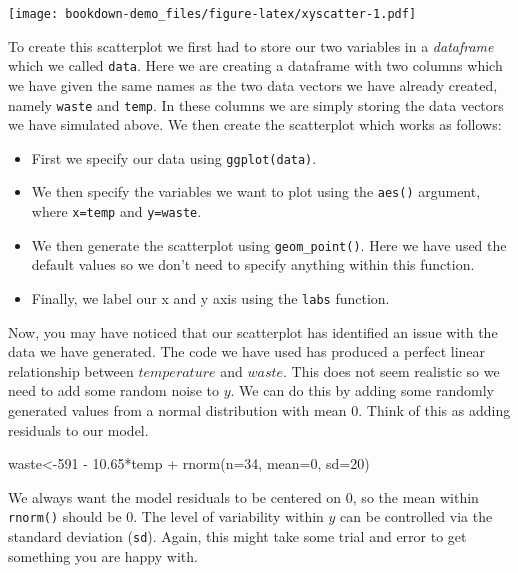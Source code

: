 \documentclass[
]{book}
\newenvironment{Shaded}{\begin{snugshade}}{\end{snugshade}}
\newcommand{\AttributeTok}[1]{\textcolor[rgb]{0.77,0.63,0.00}{#1}}
\newcommand{\DecValTok}[1]{\textcolor[rgb]{0.00,0.00,0.81}{#1}}
\newcommand{\FloatTok}[1]{\textcolor[rgb]{0.00,0.00,0.81}{#1}}
\newcommand{\FunctionTok}[1]{\textcolor[rgb]{0.00,0.00,0.00}{#1}}
\newcommand{\NormalTok}[1]{#1}
\newcommand{\OtherTok}[1]{\textcolor[rgb]{0.56,0.35,0.01}{#1}}
\newcommand{\SpecialCharTok}[1]{\textcolor[rgb]{0.00,0.00,0.00}{#1}}
\providecommand{\tightlist}{%
  \setlength{\itemsep}{0pt}\setlength{\parskip}{0pt}}
\begin{document}
\texttt{[image: bookdown-demo\_files/figure-latex/xyscatter-1.pdf]}

To create this scatterplot we first had to store our two variables in a \emph{dataframe} which we called \texttt{data}. Here we are creating a dataframe with two columns which we have given the same names as the two data vectors we have already created, namely \texttt{waste} and \texttt{temp}. In these columns we are simply storing the data vectors we have simulated above. We then create the scatterplot which works as follows:

\begin{itemize}
\tightlist
\item
  First we specify our data using \texttt{ggplot(data)}.
\item
  We then specify the variables we want to plot using the \texttt{aes()} argument, where \texttt{x=temp} and \texttt{y=waste}.
\item
  We then generate the scatterplot using \texttt{geom\_point()}. Here we have used the default values so we don't need to specify anything within this function.
\item
  Finally, we label our x and y axis using the \texttt{labs} function.
\end{itemize}

Now, you may have noticed that our scatterplot has identified an issue with the data we have generated. The code we have used has produced a perfect linear relationship between \(temperature\) and \(waste\). This does not seem realistic so we need to add some random noise to \(y\). We can do this by adding some randomly generated values from a normal distribution with mean 0. Think of this as adding residuals to our model.

\begin{Shaded}
\begin{Highlighting}[]
\NormalTok{waste}\OtherTok{\textless{}{-}}\DecValTok{591} \SpecialCharTok{{-}} \FloatTok{10.65}\SpecialCharTok{*}\NormalTok{temp }\SpecialCharTok{+} \FunctionTok{rnorm}\NormalTok{(}\AttributeTok{n=}\DecValTok{34}\NormalTok{, }\AttributeTok{mean=}\DecValTok{0}\NormalTok{, }\AttributeTok{sd=}\DecValTok{20}\NormalTok{)}
\end{Highlighting}
\end{Shaded}

We always want the model residuals to be centered on 0, so the mean within \texttt{rnorm()} should be 0. The level of variability within \(y\) can be controlled via the standard deviation (\texttt{sd}). Again, this might take some trial and error to get something you are happy with.
\end{document}
